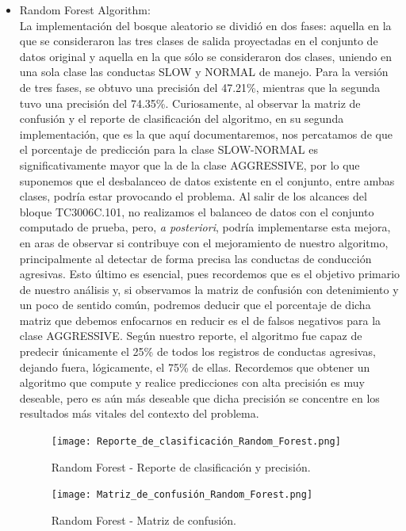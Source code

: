 \documentclass[spanish,12pt,letterpaper]{article}
\begin{document}
\begin{itemize}
    \item Random Forest Algorithm:\\
    La implementación del bosque aleatorio se dividió en dos fases: aquella en la que se consideraron las tres clases de salida proyectadas en el conjunto de datos original y aquella en la que sólo se consideraron dos clases, uniendo en una sola clase las conductas SLOW y NORMAL de manejo. Para la versión de tres fases, se obtuvo una precisión del 47.21\%, mientras que la segunda tuvo una precisión del 74.35\%. Curiosamente, al observar la matriz de confusión y el reporte de clasificación del algoritmo, en su segunda implementación, que es la que aquí documentaremos, nos percatamos de que el porcentaje de predicción para la clase SLOW-NORMAL es significativamente mayor que la de la clase AGGRESSIVE, por lo que suponemos que el desbalanceo de datos existente en el conjunto, entre ambas clases, podría estar provocando el problema. Al salir de los alcances del bloque TC3006C.101, no realizamos el balanceo de datos con el conjunto computado de prueba, pero, \textit{a posteriori}, podría implementarse esta mejora, en aras de observar si contribuye con el mejoramiento de nuestro algoritmo, principalmente al detectar de forma precisa las conductas de conducción agresivas. Esto último es esencial, pues recordemos que es el objetivo primario de nuestro análisis y, si observamos la matriz de confusión con detenimiento y un poco de sentido común, podremos deducir que el porcentaje de dicha matriz que debemos enfocarnos en reducir es el de falsos negativos para la clase AGGRESSIVE. Según nuestro reporte, el algoritmo fue capaz de predecir únicamente el 25\% de todos los registros de conductas agresivas, dejando fuera, lógicamente, el 75\% de ellas. Recordemos que obtener un algoritmo que compute y realice predicciones con alta precisión es muy deseable, pero es aún más deseable que dicha precisión se concentre en los resultados más vitales del contexto del problema.
    \\
    \begin{figure}[H]
        \centering
        \texttt{[image: Reporte\_de\_clasificación\_Random\_Forest.png]}
        \caption{Random Forest - Reporte de clasificación y precisión.}
        \label{fig:comand}%
    \end{figure}
    
    \begin{figure}[H]
        \centering
        \texttt{[image: Matriz\_de\_confusión\_Random\_Forest.png]}
        \caption{Random Forest - Matriz de confusión.}
        \label{fig:comand}%
    \end{figure}
    

\end{itemize}
\end{document}
